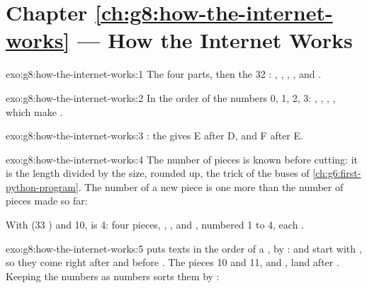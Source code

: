 \section*{Chapter \ref{ch:g8:how-the-internet-works} --- How the Internet Works}

\begin{solution}{exo:g8:how-the-internet-works:1}
The four parts, then the 32 :
, , ,
, and
.
\end{solution}

\begin{solution}{exo:g8:how-the-internet-works:2}
In the order of the numbers 0, 1, 2, 3: , ,
, , which make .
\end{solution}

\begin{solution}{exo:g8:how-the-internet-works:3}
: the  gives E after D, and F after E.
\end{solution}

\begin{solution}{exo:g8:how-the-internet-works:4}
The number of pieces is known before cutting: it is the length divided by the
size, rounded up, the trick of the buses of \cref{ch:g6:first-python-program}.
The number of a new piece is one more than the number of pieces made so far:

\label{lst:g8:how-the-internet-works:sol-cut}

With  (33 ) and 10,
 is 4: four pieces, \mbox{},
\mbox{}, \mbox{} and , numbered 1 to 4,
each \mbox{}.
\end{solution}

\begin{solution}{exo:g8:how-the-internet-works:5}
 puts texts in the order of a ,  by
:  and  start with , so they come right
after  and before . The pieces 10 and 11,  and
, land after . Keeping the numbers as numbers sorts them by
:

\label{lst:g8:how-the-internet-works:sol-rebuild}
\end{solution}

